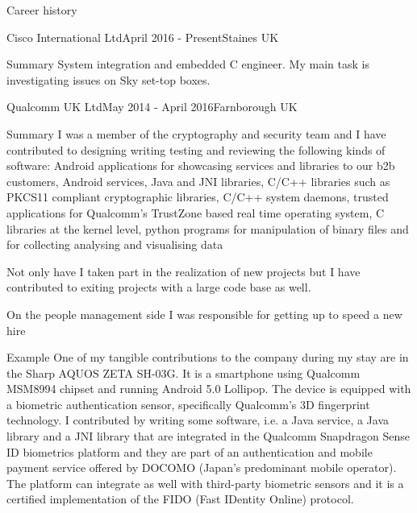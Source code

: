\documentclass{resume}
\begin{document}
  \begin{rSection}{Career history}
    \begin{rSubsection}{Cisco International Ltd}{April 2016 - Present}{}{Staines UK}
    \item[Summary]
      System integration and embedded C engineer. My main task is investigating issues on Sky set-top boxes. 
    \end{rSubsection}

    \begin{rSubsection}{Qualcomm UK Ltd}{May 2014 - April 2016}{}{Farnborough UK}
	\item[Summary]
	  I was a member of the cryptography and security team and I have contributed to designing writing testing and reviewing the following kinds of software:
	  Android applications for showcasing services and libraries to our b2b customers,
	  Android services, 
	  Java and JNI libraries, 
	  C/C++ libraries such as PKCS11 compliant cryptographic libraries,
	  C/C++ system daemons,
	  trusted applications for Qualcomm's TrustZone based real time operating system,
	  C libraries at the kernel level,
	  python programs for manipulation of binary files and for collecting analysing and visualising data

	  Not only have I taken part in the realization of new projects but I have contributed to exiting projects with a large code base as well.

	  On the people management side I was responsible for getting up to speed a new hire
	  
	  
	\item[Example]
	  One of my tangible contributions to the company during my stay are in the Sharp AQUOS ZETA SH-03G.
	  It is a smartphone using Qualcomm MSM8994 chipset and running Android 5.0 Lollipop. 
	  The device is equipped with a biometric authentication sensor, specifically
	  Qualcomm's 3D fingerprint technology.
	  I contributed by writing some software, i.e. a Java service, a Java library and a JNI library
	  that are integrated in the Qualcomm Snapdragon Sense ID biometrics platform and they
	  are part of an authentication and mobile payment service offered by DOCOMO (Japan's predominant mobile operator).
	  The platform can integrate as well with third-party biometric sensors and it is a certified
	  implementation of the FIDO (Fast IDentity Online) protocol.
    \end{rSubsection}


\end{rSection}
\end{document}
